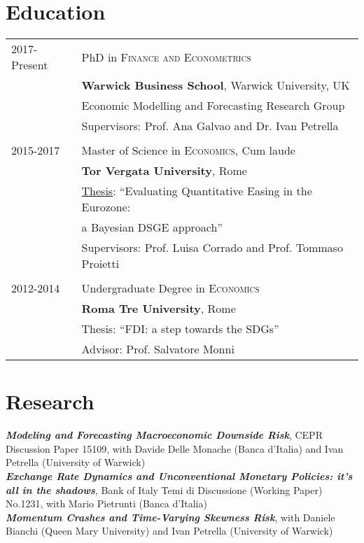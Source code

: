 \documentclass[a4paper,12pt]{article}
\begin{document}
\section{Education}
\begin{tabular}{ll}	
2017-Present & PhD in \textsc{Finance and Econometrics}\\
&\textbf{Warwick Business School}, Warwick University, UK\\
&Economic Modelling and Forecasting Research Group\\
&Supervisors: Prof. Ana Galvao and Dr. Ivan Petrella\\&\\
2015-2017 & Master of Science in \textsc{Economics}, Cum laude\\
&\textbf{Tor Vergata University}, Rome\\
&\href{https://www.dropbox.com/s/4td40tzwfrivuc9/Pres.zip?dl=0}{Thesis}: ``Evaluating Quantitative Easing in the Eurozone:\\
& \hspace{3.5em} a Bayesian DSGE approach''\\
& Supervisors: Prof. Luisa Corrado and Prof. Tommaso Proietti\\&\\
2012-2014& Undergraduate Degree in \textsc{Economics}\\ 
&\textbf{Roma Tre University}, Rome\\
& Thesis: ``FDI: a step towards the SDGs''\\
&\small Advisor: Prof. Salvatore Monni\\
\end{tabular}

\section{Research}
\textit{\textbf{Modeling and Forecasting Macroeconomic Downside Risk}}, CEPR Discussion Paper 15109, with Davide Delle Monache (Banca d'Italia) and Ivan Petrella (University of Warwick)\\[.2em]
\textit{\textbf{Exchange Rate Dynamics and Unconventional Monetary Policies: it’s all in the shadows}}, Bank of Italy Temi di Discussione (Working Paper) No.1231, with Mario Pietrunti (Banca d'Italia)\\[.2em]
\textit{\textbf{Momentum Crashes and Time-Varying Skewness Risk}}, with Daniele Bianchi (Queen Mary University) and Ivan Petrella (University of Warwick)
\end{document}
